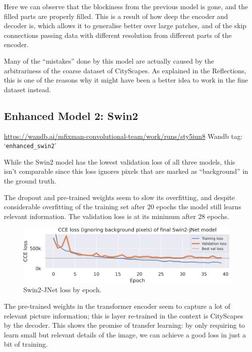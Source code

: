 Here we can observe that the blockiness from the previous model is gone, and the filled parts are properly filled.
This is a result of how deep the encoder and decoder is, which allows it to generalise better over large patches, and of the skip connections passing data with different resolution from different parts of the encoder.

Many of the ``mistakes'' done by this model are actually caused by the arbitrariness of the coarse dataset of CityScapes.
As explained in the Reflections, this is one of the reasons why it might have been a better idea to work in the fine dataset instead.

\newpage{}

\subsection{Enhanced Model 2: Swin2}
\begin{scriptsize}
	\vspace{-\parskip}
	\url{https://wandb.ai/mfixman-convolutional-team/work/runs/sty5iun8}
	\hfill{} Wandb tag: `\texttt{enhanced\_swin2}'
\end{scriptsize}

While the Swin2 model has the lowest validation loss of all three models, this isn't comparable since this loss ignores pixels that are marked as ``background'' in the ground truth.

The dropout and pre-trained weights seem to slow its overfitting, and despite considerable overfitting of the training set after 20 epochs the model still learns relevant information.
The validation loss is at its minimum after 28 epochs.

\begin{figure}[h]
	\centering
	\includegraphics[width=.9\textwidth]{swin2_loss.png}
	\caption{Swin2-JNet loss by epoch.}
	\label{swin2_model_loss}
\end{figure}

The pre-trained weights in the transformer encoder seem to capture a lot of relevant picture information; this is layer re-trained in the context is CityScapes by the decoder.
This shows the promise of transfer learning: by only requiring to learn small but relevant details of the image, we can achieve a good loss in just a bit of training.

